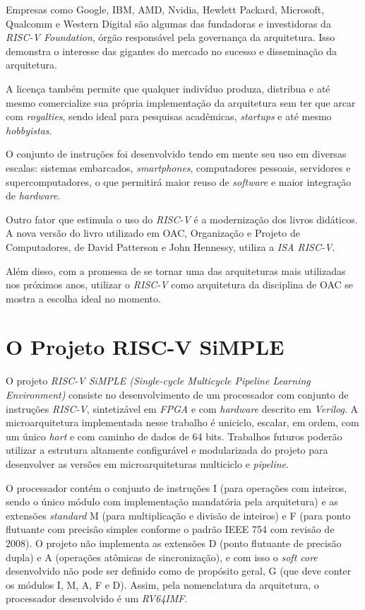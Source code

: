 {
    Empresas como Google, IBM, AMD, Nvidia, Hewlett Packard, Microsoft,
    Qualcomm e Western Digital são algumas das fundadoras e investidoras
    da \textit{RISC-V Foundation}, órgão responsável pela governança da
    arquitetura. Isso demonstra o interesse das gigantes do mercado no
    sucesso e disseminação da arquitetura.
}

{
    A licença também permite que qualquer indivíduo produza, distribua e
    até mesmo comercialize sua própria implementação da arquitetura sem ter
    que arcar com \textit{royalties}, sendo ideal para pesquisas
    acadêmicas, \textit{startups} e até mesmo \textit{hobbyistas}.
}

{
    O conjunto de instruções foi desenvolvido tendo em mente seu uso em
    diversas escalas: sistemas embarcados, \textit{smartphones},
    computadores pessoais, servidores e supercomputadores, o que permitirá
    maior reuso de \textit{software} e maior integração de
    \textit{hardware}.
}

{
    Outro fator que estimula o uso do \textit{RISC-V} é a modernização dos
    livros didáticos. A nova versão do livro utilizado em OAC, Organização
    e Projeto de Computadores, de David Patterson e John Hennessy, utiliza
    a \textit{ISA RISC-V}.
}

{
    Além disso, com a promessa de se tornar uma das arquiteturas mais
    utilizadas nos próximos anos, utilizar o \textit{RISC-V} como
    arquitetura da disciplina de OAC se mostra a escolha ideal no momento.
}

\section{O Projeto RISC-V SiMPLE}
{
    O projeto \textit{RISC-V SiMPLE (Single-cycle Multicycle Pipeline
    Learning Environment)} consiste no desenvolvimento de um processador
    com conjunto de instruções \textit{RISC-V}, sintetizável em
    \textit{FPGA} e com \textit{hardware} descrito em \textit{Verilog}. A
    microarquitetura implementada nesse trabalho é uniciclo, escalar, em
    ordem, com um único \textit{hart} e com caminho de dados de 64 bits.
    Trabalhos futuros poderão utilizar a estrutura altamente configurável
    e modularizada do projeto para desenvolver as versões em
    microarquiteturas multiciclo e \textit{pipeline}.
}

{
    O processador contém o conjunto de instruções I (para operações com
    inteiros, sendo o único módulo com implementação mandatória pela
    arquitetura) e as extensões \textit{standard} M (para multiplicação e
    divisão de inteiros) e F (para ponto flutuante com precisão simples
    conforme o padrão IEEE 754 com revisão de 2008). O projeto não
    implementa as extensões D (ponto flutuante de precisão dupla) e A
    (operações atômicas de sincronização), e com isso o \textit{soft core}
    desenvolvido não pode ser definido como de propósito geral, G (que deve
    conter os módulos I, M, A, F e D). Assim, pela nomenclatura da
    arquitetura, o processador desenvolvido é um \textit{RV64IMF}.
}

